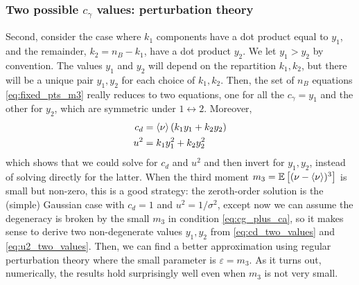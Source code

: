 \subsubsection{Two possible $c_{\gamma}$ values: perturbation theory}
\label{subsect:perturbation_theory}
Second, consider the case where $k_1$ components have a dot product equal to $y_1$, and the remainder, $k_2 = n_B - k_1$, have a dot product $y_2$. We let $y_1 > y_2$ by convention. The values $y_1$ and $y_2$ will depend on the repartition $k_1, k_2$, but there will be a unique pair $y_1,y_2$ for each choice of $k_1, k_2$. Then, the set of $n_B$ equations \eqref{eq:fixed_pts_m3} really reduces to two equations, one for all the $c_{\gamma} = y_1$ and the other for $y_2$, which are symmetric under $1 \leftrightarrow 2$. Moreover, 
\begin{align}
	c_d &= \braket{\nu} (k_1 y_1 + k_2 y_2)	\label{eq:cd_two_values}	\\
	u^2 &=  k_1 y_1^2 + k_2 y_2^2 	\label{eq:u2_two_values}
\end{align}
which shows that we could solve for $c_d$ and $u^2$ and then invert for $y_1, y_2$, instead of solving directly for the latter. When the third moment $m_3 = \mathbb{E}\left[ (\nu - \braket{\nu})^3 \right]$ is small but non-zero, this is a good strategy: the zeroth-order solution is the (simple) Gaussian case with $c_d = 1$ and $u^2 = 1/\sigma^2$, except now we can assume the degeneracy is broken by the small $m_3$ in condition \eqref{eq:cg_plus_ca}, so it makes sense to derive two non-degenerate values $y_1, y_2$ from \eqref{eq:cd_two_values} and \eqref{eq:u2_two_values}. 
Then, we can find a better approximation using regular perturbation theory where the small parameter is $\varepsilon = m_3$. As it turns out, numerically, the results hold surprisingly well even when $m_3$ is not very small.  

